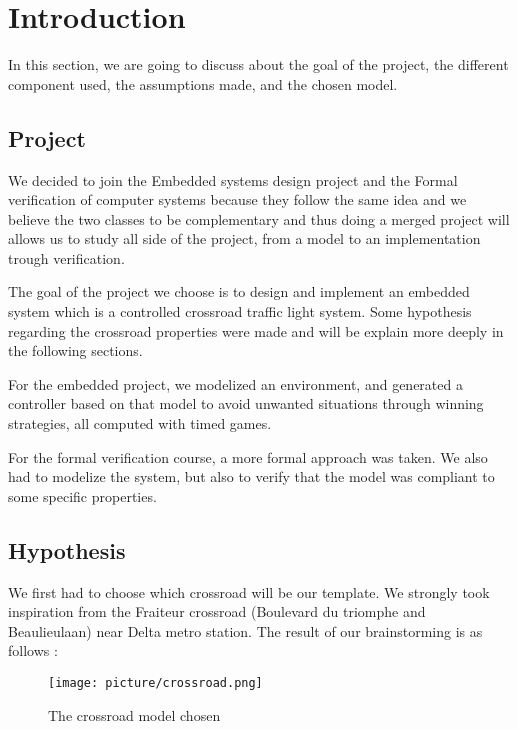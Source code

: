 \section{Introduction}
In this section, we are going to discuss about the goal of the project, the different component used, the assumptions made, and the chosen model.

\subsection{Project}

We decided to join the Embedded systems design project and the Formal verification of computer systems because they follow the same idea and we believe the two classes to be complementary and thus doing a merged project will allows us to study all side of the project, from a model to an implementation trough verification.

The goal of the project we choose is to design and implement an embedded system which is a controlled crossroad traffic light system. Some hypothesis regarding the crossroad properties were made and will be explain more deeply in the following sections.

For the embedded project, we modelized an environment, and generated a controller based on that model to avoid unwanted situations through winning strategies, all computed with timed games. 

For the formal verification course, a more formal approach was taken. We also had to modelize the system, but also to verify that the model was compliant to some specific properties. 

\subsection{Hypothesis}

We first had to choose which crossroad will be our template. We strongly took inspiration from the Fraiteur crossroad (Boulevard du triomphe and Beaulieulaan) near Delta metro station. The result of our brainstorming is as follows :

\begin{figure}[!ht] \label{fig:crossroad}
  \centering
    \texttt{[image: picture/crossroad.png]}
    \caption{The crossroad model chosen}
\end{figure}

